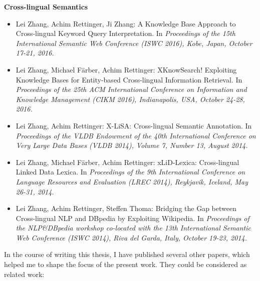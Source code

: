 \forceindent\textbf{Cross-lingual Semantics}
\begin{itemize}
    \item  Lei Zhang, Achim Rettinger, Ji Zhang: A Knowledge Base Approach to Cross-lingual Keyword Query Interpretation. In \emph{Proceedings of the 15th International Semantic Web Conference (ISWC 2016), Kobe, Japan, October 17-21, 2016.}~\cite{DBLP:conf/semweb/ZhangRZ16}
    \item Lei Zhang, Michael Färber, Achim Rettinger: XKnowSearch! Exploiting Knowledge Bases for Entity-based Cross-lingual Information Retrieval. In \emph{Proceedings of the 25th ACM International Conference on Information and Knowledge Management (CIKM 2016), Indianapolis, USA, October 24-28, 2016.}~\cite{DBLP:conf/cikm/Zhang16}
    \item Lei Zhang, Achim Rettinger: X-LiSA: Cross-lingual Semantic Annotation. In \emph{ Proceedings of the VLDB Endowment of the 40th International Conference on Very Large Data Bases (VLDB 2014), Volume 7, Number 13, August 2014.}~\cite{xlisa}
    \item Lei Zhang, Michael Färber, Achim Rettinger: xLiD-Lexica: Cross-lingual Linked Data Lexica. In \emph{Proceedings of the 9th International Conference on Language Resources and Evaluation (LREC 2014), Reykjavik, Iceland, May 26-31, 2014.}~\cite{Zhang2014}
    \item Lei Zhang, Achim Rettinger, Steffen Thoma: Bridging the Gap between Cross-lingual NLP and DBpedia by Exploiting Wikipedia. In \emph{Proceedings of the NLP{\&}DBpedia workshop co-located with the 13th International Semantic Web Conference (ISWC 2014), Riva del Garda, Italy, October 19-23, 2014.}~\cite{zhang2014btgbcnadbew}
\end{itemize}

In the course of writing this thesis, I have published several other papers, which helped me to shape the focus of the present work. They could be considered as related work:  

